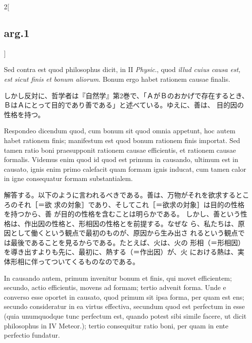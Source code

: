\documentclass[paper=a4paper,fontsize=10pt,jafontsize=9pt,titlepage]{jlreq}
\begin{document}
\begin{paracol}{2}[\subsection{arg.1}]
\switchcolumn*[\subsection{s.c.}]

Sed contra est quod philosophus dicit, in II {\itshape Physic}., quod
 {\itshape illud cuius causa est, est sicut finis et bonum
 aliorum}. Bonum ergo habet rationem causae finalis.

\switchcolumn

しかし反対に、哲学者は『自然学』第2巻で、「ＡがＢのおかげで存在するとき、
 ＢはＡにとって目的であり善である」と述べている。ゆえに、善は、
 目的因の性格を持つ。


Respondeo dicendum quod, cum bonum sit quod omnia appetunt, hoc autem
 habet rationem finis; manifestum est quod bonum rationem finis
 importat. 
Sed tamen ratio boni praesupponit rationem causae efficientis, et
 rationem causae formalis. Videmus enim quod id quod est primum in
 causando, ultimum est in causato, ignis enim primo calefacit quam
 formam ignis inducat, cum tamen calor in igne consequatur formam
 substantialem.

\switchcolumn

解答する。以下のように言われるべきである。善は、万物がそれを欲求するところのそれ［＝欲
 求の対象］であり、そしてこれ［＝欲求の対象］は目的の性格を持つから、善
 が目的の性格を含むことは明らかである。
しかし、善という性格は、作出因の性格と、形相因の性格とを前提する。なぜな
 ら、私たちは、原因として働くという観点で最初のものが、原因から生み出さ
 れるという観点では最後であることを見るからである。たとえば、火は、火の
 形相（＝形相因）を導き出すよりも先に、最初に、熱する（＝作出因）が、火
 における熱は、実体形相に伴ってついてくるものなのである。

\switchcolumn*

In causando autem, primum invenitur bonum et finis, qui movet
 efficientem; secundo, actio efficientis, movens ad formam; tertio
 advenit forma. 
Unde e converso esse oportet in causato, quod primum sit ipsa forma, per
 quam est ens; secundo consideratur in ea virtus effectiva, secundum
 quod est perfectum in esse (quia unumquodque tunc perfectum est, quando
 potest sibi simile facere, ut dicit philosophus in IV Meteor.); tertio
 consequitur ratio boni, per quam in ente perfectio fundatur.


\end{paracol}
\end{document}

